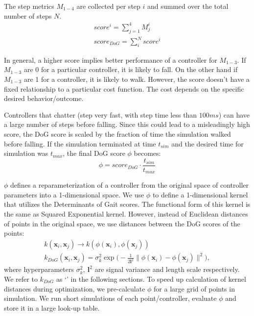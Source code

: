 The step metrics $M_{1-4}$ are collected per step $i$ and summed over the total number of steps $N$. 
\begin{align}
\label{eq:dog}
 score^i = \sum_{j=1}^4 M^i_j  \\
 score_{DoG} = \sum_i^{N} score^i
\end{align}

In general, a higher score implies better performance of a controller for $M_{1-3}$. If $M_{1-3}$ are 0 for a particular controller, it is likely to fall. On the other hand if $M_{1-3}$ are 1 for a controller, it is likely to walk. However, the score doesn't have a fixed relationship to a particular cost function. The cost depends on the specific desired behavior/outcome.

Controllers that chatter (step very fast, with step time less than $100ms$) can have a large number of steps before falling. Since this could lead to a misleadingly high score, the DoG score is scaled by the fraction of time the simulation walked before falling. If the simulation terminated at time $t_{sim}$ and the desired time for simulation was $t_{max}$, the final DoG score $\phi$ becomes:
\begin{equation}
    \phi = score_{DoG} \cdot \frac{t_{sim}}{t_{max}}
\end{equation}

$\phi$ defines a reparameterization of a controller from the original space of controller parameters into a 1-dimensional space. We use $\phi$ to define a 1-dimensional kernel that utilizes the Determinants of Gait scores. The functional form of this kernel is the same as Squared Exponential kernel. However, instead of Euclidean distances of points in the original space, we use distances between the DoG scores of the points:
\begin{align}
    k(\pmb{x}_i, \pmb{x}_j) \rightarrow k(\phi(\pmb{x}_i), \phi(\pmb{x}_j)) \\
    k_{DoG}(\pmb{x}_i, \pmb{x}_j) = \sigma_k^2 \exp\Big(- \frac{1}{2 \pmb{l}^2} \|\phi(\pmb{x}_i) - \phi(\pmb{x}_j)\|^2 \Big),
\end{align}
where hyperparameters $\sigma_k^2, \ \pmb{l}^2$ are signal variance and length scale respectively. We refer to $k_{DoG}$ as `\dogkernel' in the following sections.
To speed up calculation of kernel distances during optimization, we pre-calculate $\phi$ for a large grid of points in simulation. We run short simulations of each point/controller, evaluate $\phi$ and store it in a large look-up table.

